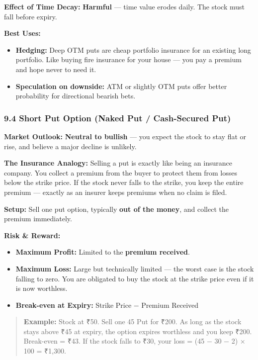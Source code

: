 \documentclass[12pt,openany]{book}
\begin{document}
\textbf{Effect of Time Decay:} \textbf{Harmful} — time value erodes daily. The stock must fall before expiry.

\textbf{Best Uses:}
\begin{itemize}[leftmargin=*]
    \item \textbf{Hedging:} Deep OTM puts are cheap portfolio insurance for an existing long portfolio. Like buying fire insurance for your house — you pay a premium and hope never to need it.
    \item \textbf{Speculation on downside:} ATM or slightly OTM puts offer better probability for directional bearish bets.
\end{itemize}

\subsubsection{9.4 Short Put Option (Naked Put / Cash-Secured Put)}

\textbf{Market Outlook:} \textbf{Neutral to bullish} — you expect the stock to stay flat or rise, and believe a major decline is unlikely.

\textbf{The Insurance Analogy:} Selling a put is exactly like being an insurance company. You collect a premium from the buyer to protect them from losses below the strike price. If the stock never falls to the strike, you keep the entire premium — exactly as an insurer keeps premiums when no claim is filed.

\textbf{Setup:} Sell one put option, typically \textbf{out of the money}, and collect the premium immediately.

\textbf{Risk \& Reward:}
\begin{itemize}[leftmargin=*]
    \item \textbf{Maximum Profit:} Limited to the \textbf{premium received}.
    \item \textbf{Maximum Loss:} Large but technically limited — the worst case is the stock falling to zero. You are obligated to buy the stock at the strike price even if it is now worthless.
    \item \textbf{Break-even at Expiry:} Strike Price − Premium Received
\end{itemize}

\begin{quote}
\textbf{Example:} Stock at ₹50. Sell one 45 Put for ₹200. As long as the stock stays above ₹45 at expiry, the option expires worthless and you keep ₹200. Break-even = ₹43. If the stock falls to ₹30, your loss = (45 − 30 − 2) × 100 = ₹1,300.
\end{quote}
\end{document}
